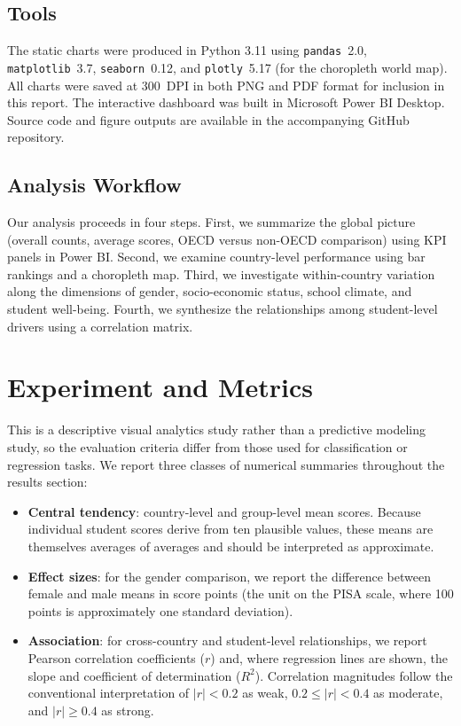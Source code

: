 \documentclass[conference]{IEEEtran}
\begin{document}
\subsection{Tools}

The static charts were produced in Python 3.11 using \texttt{pandas}~2.0, \texttt{matplotlib}~3.7, \texttt{seaborn}~0.12, and \texttt{plotly}~5.17 (for the choropleth world map). All charts were saved at 300~DPI in both PNG and PDF format for inclusion in this report. The interactive dashboard was built in Microsoft Power BI Desktop. Source code and figure outputs are available in the accompanying GitHub repository.

\subsection{Analysis Workflow}

Our analysis proceeds in four steps. First, we summarize the global picture (overall counts, average scores, OECD versus non-OECD comparison) using KPI panels in Power BI. Second, we examine country-level performance using bar rankings and a choropleth map. Third, we investigate within-country variation along the dimensions of gender, socio-economic status, school climate, and student well-being. Fourth, we synthesize the relationships among student-level drivers using a correlation matrix.

\section{Experiment and Metrics}
\label{sec:metrics}

This is a descriptive visual analytics study rather than a predictive modeling study, so the evaluation criteria differ from those used for classification or regression tasks. We report three classes of numerical summaries throughout the results section:

\begin{itemize}
    \item \textbf{Central tendency}: country-level and group-level mean scores. Because individual student scores derive from ten plausible values, these means are themselves averages of averages and should be interpreted as approximate.
    \item \textbf{Effect sizes}: for the gender comparison, we report the difference between female and male means in score points (the unit on the PISA scale, where 100 points is approximately one standard deviation).
    \item \textbf{Association}: for cross-country and student-level relationships, we report Pearson correlation coefficients ($r$) and, where regression lines are shown, the slope and coefficient of determination ($R^{2}$). Correlation magnitudes follow the conventional interpretation of $|r|<0.2$ as weak, $0.2 \le |r| < 0.4$ as moderate, and $|r| \ge 0.4$ as strong.
\end{itemize}
\end{document}
